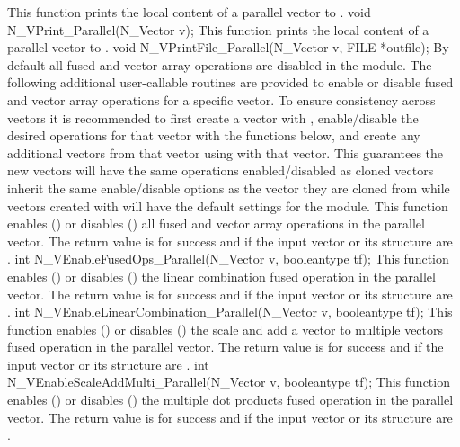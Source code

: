 {
  This function prints the local content of a parallel vector to .
}
{
  void N\_VPrint\_Parallel(N\_Vector v);
}
{
  This function prints the local content of a parallel vector to .
}
{
  void N\_VPrintFile\_Parallel(N\_Vector v, FILE *outfile);
}
By default all fused and vector array operations are disabled in the {\nvecp}
module. The following additional user-callable routines are provided to
enable or disable fused and vector array operations for a specific vector. To
ensure consistency across vectors it is recommended to first create a vector
with , enable/disable the desired operations for that vector
with the functions below, and create any additional vectors from that vector
using  with that vector. This guarantees the new vectors will
have the same operations enabled/disabled as cloned vectors inherit the same
enable/disable options as the vector they are cloned from while vectors created with
 will have the default settings for the {\nvecp} module.
{
  This function enables () or disables () all fused and
  vector array operations in the parallel vector. The return value is  for
  success and  if the input vector or its  structure are .
}
{
  int N\_VEnableFusedOps\_Parallel(N\_Vector v, booleantype tf);
}
{
  This function enables () or disables () the linear
  combination fused operation in the parallel vector. The return value is  for
  success and  if the input vector or its  structure are .
}
{
  int N\_VEnableLinearCombination\_Parallel(N\_Vector v, booleantype tf);
}
{
  This function enables () or disables () the scale and
  add a vector to multiple vectors fused operation in the parallel vector. The
  return value is  for success and  if the input vector or its
   structure are .
}
{
  int N\_VEnableScaleAddMulti\_Parallel(N\_Vector v, booleantype tf);
}
{
  This function enables () or disables () the multiple
  dot products fused operation in the parallel vector. The return value is 
  for success and  if the input vector or its  structure are
  .
}
